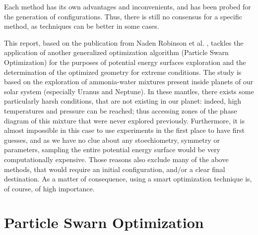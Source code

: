 \documentclass[11pt]{article}
\begin{document}
\begin{multicols}{2}
Each method has its own advantages and inconvenients, and has been probed for the generation of configurations. Thus, there is still no consensus for a specific method, as techniques can be better in some cases. \vspace{1em}

This report, based on the publication from Naden Robinson et al. \cite{original}, tackles the application of another generalized optimization algorithm (Particle Swarn Optimization) for the purposes of potential energy surfaces exploration and the determination of the optimized geometry for extreme conditions. The study is based on the exploration of ammonia-water mixtures present inside planets of our solar system (especially Uranus and Neptune). In these mantles, there exists some particularly harsh conditions, that are not existing in our planet: indeed, high temperatures and pressure can be reached; thus accessing zones of the phase diagram of this mixture that were never explored previously. Furthermore, it is almost impossible in this case to use experiments in the first place to have first guesses, and as we have no clue about any stoechiometry, symmetry or parameters, sampling the entire potential energy surface would be very computationally expensive. Those reasons also exclude many of the above methods, that would require an initial configuration, and/or a clear final destination. As a matter of consequence, using a smart optimization technique is, of course, of high importance.

\section*{Particle Swarn Optimization}

\end{multicols}
\end{document}
